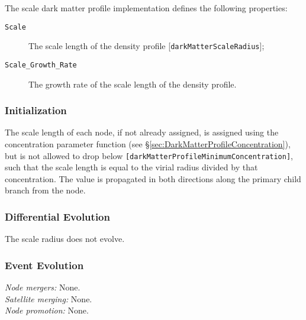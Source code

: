 The scale dark matter profile implementation defines the following properties:
\begin{description}
 \item [{\tt Scale}] The scale length of the density profile [{\tt darkMatterScaleRadius}];
 \item [{\tt Scale\_Growth\_Rate}] The growth rate of the scale length of the density profile.
\end{description}

\subsubsection{Initialization}

The scale length of each node, if not already assigned, is assigned using the concentration parameter function (see \S\ref{sec:DarkMatterProfileConcentration}), but is not allowed to drop below {\tt [darkMatterProfileMinimumConcentration]}, such that the scale length is equal to the virial radius divided by that concentration. The value is propagated in both directions along the primary child branch from the node.

\subsubsection{Differential Evolution}

The scale radius does not evolve.

\subsubsection{Event Evolution}

\noindent\emph{Node mergers:} None.\\

\noindent\emph{Satellite merging:} None.\\

\noindent\emph{Node promotion:} None.\\

